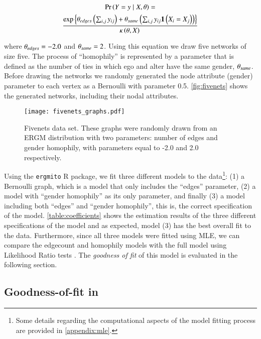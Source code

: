 \documentclass[review]{elsarticle}
\begin{document}
\begin{multline*}
\Prcond{\Adjmat = \adjmat}{\Indepvar, \params} = \\
\frac{ %
    \exp{\params_{edges}\left(\sum_{i,j} \adjmat_{ij}\right) + %
    \params_{same}\left(\sum_{i,j} \adjmat_{ij}\isone{\Indepvar_{i} = \Indepvar_{j}}\right)} %
    }{%
    \normconst{}
    }
\end{multline*}

\noindent where $\theta_{edges} = -2.0$ and $\theta_{same} = 2$. Using this equation we draw five networks of size five. The process of ``homophily'' is represented by a parameter that is defined as the number of ties in which ego and alter have the same gender, $\theta_{same}$. Before drawing the networks we randomly generated the node attribute (gender) parameter to each vertex as a Bernoulli with parameter 0.5. \autoref{fig:fivenets} shows the generated networks, including their nodal attributes.

\begin{figure}[tb]
    \centering
    \texttt{[image: fivenets\_graphs.pdf]}
    \caption{\label{fig:fivenets}Fivenets data set. These graphs were randomly drawn from an ERGM distribution with two parameters: number of edges and gender homophily, with parameters equal to -2.0 and 2.0 respectively.}
    \label{fig:my_label}
\end{figure}

Using the \texttt{ergmito} R package, we fit three different models to the data\footnote{Some details regarding the computational aspects of the model fitting process are provided in \ref{appendix:mle}.}: (1) a Bernoulli graph, which is a model that only includes the ``edges'' parameter, (2) a model with ``gender homophily'' as its only parameter, and finally (3) a model including both ``edges'' and ``gender homophily'', this is, the correct specification of the model. \autoref{table:coefficients} shows the estimation results of the three different specifications of the model and as expected, model (3) has the best overall fit to the data. Furthermore, since all three models were fitted using MLE, we can compare the edgecount and homophily models with the full model using Likelihood Ratio tests \cite{Zeileis2002}. The \textit{goodness of fit} of this model is evaluated in the following section.




\subsection{Goodness-of-fit in \ergmitos}
\end{document}
